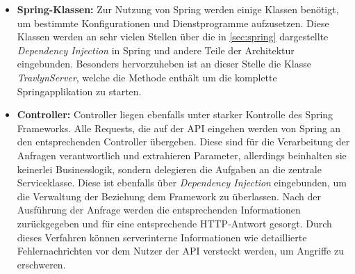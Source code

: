 	\begin{itemize}
		\item \textbf{Spring-Klassen:} Zur Nutzung von Spring werden einige Klassen benötigt, um bestimmte Konfigurationen und Dienstprogramme aufzusetzen. Diese Klassen werden an sehr vielen Stellen über die in \autoref{sec:spring} dargestellte \textit{Dependency Injection} in Spring und andere Teile der Architektur eingebunden. Besonders hervorzuheben ist an dieser Stelle die Klasse \textit{TravlynServer}, welche die Methode enthält um die komplette Springapplikation zu starten.
		\item \textbf{Controller:} Controller liegen ebenfalls unter starker Kontrolle des Spring Frameworks. Alle Requests, die auf der API eingehen werden von Spring an den entsprechenden Controller übergeben. Diese sind für die Verarbeitung der Anfragen verantwortlich und extrahieren Parameter, allerdings beinhalten sie keinerlei Businesslogik, sondern delegieren die Aufgaben an die zentrale Serviceklasse. Diese ist ebenfalls über \textit{Dependency Injection} eingebunden, um die Verwaltung der Beziehung dem Framework zu überlassen. Nach der Ausführung der Anfrage werden die entsprechenden Informationen zurückgegeben und für eine entsprechende HTTP-Antwort gesorgt. Durch dieses Verfahren können serverinterne Informationen wie detaillierte Fehlernachrichten vor dem Nutzer der API versteckt werden, um Angriffe zu erschweren.
		

\end{itemize}
